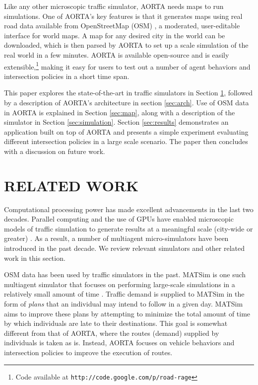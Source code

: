 \documentclass[letterpaper, 10 pt, conference]{ieeeconf}  %
\begin{document}
Like any other microscopic traffic simulator, AORTA needs maps to run
simulations. One of AORTA's key features is that it generates maps using real
road data available from OpenStreetMap (OSM) \cite{osm}, a moderated,
user-editable interface for world maps. A map for any desired city in the world
can be downloaded, which is then parsed by AORTA to set up a scale simulation of
the real world in a few minutes. AORTA is available open-source and is easily
extensible,\footnote{Code available at
\texttt{http://code.google.com/p/road-rage}} making it easy for users to test
out a number of agent behaviors and intersection policies in a short time span.

This paper explores the state-of-the-art in traffic simulators in Section
\ref{sec:related_work}, followed by a description of AORTA's architecture in
section \ref{sec:arch}.  Use of OSM data in AORTA is explained in Section
\ref{sec:map}, along with a description of the simulator in Section
\ref{sec:simulation}. Section \ref{sec:results} demonstrates an application
built on top of AORTA and presents a simple experiment evaluating different
intersection policies in a large scale scenario. The paper then concludes with a
discussion on future work.


\section{RELATED WORK}
\label{sec:related_work}

Computational processing power has made excellent advancements in the last two
decades. Parallel computing and the use of GPUs have enabled microscopic models
of traffic simulation to generate results at a meaningful scale (city-wide or
greater) \cite{nagel1994microscopic,shen2011agent}. As a result, a number of
multiagent micro-simulators have been introduced in the past decade. We review
relevant simulators and other related work in this section.

OSM data has been used by traffic simulators in the past. MATSim is one such
multiagent simulator that focuses on performing large-scale simulations in a
relatively small amount of time \cite{balmer2009matsim}. Traffic demand is
supplied to MATSim in the form of \textit{plans} that an individual may intend
to follow in a given day. MATSim aims to improve these plans by attempting to
minimize the total amount of time by which individuals are late to their
destinations. This goal is somewhat different from that of AORTA, where the
routes (demand) supplied by individuals is taken as is. Instead, AORTA focuses
on vehicle behaviors and intersection policies to improve the execution of
routes.
\end{document}
